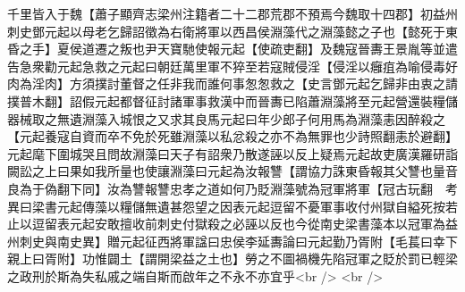 千里皆入于魏【蕭子顯齊志梁州注籍者二十二郡荒郡不預焉今魏取十四郡】初益州刺史鄧元起以母老乞歸詔徵為右衛將軍以西昌侯淵藻代之淵藻懿之子也【懿死于東昏之手】夏侯道遷之叛也尹天寶馳使報元起【使疏吏翻】及魏寇晉夀王景胤等並遣告急衆勸元起急救之元起曰朝廷萬里軍不猝至若寇賊侵淫【侵淫以癰疽為喻侵毒好肉為淫肉】方須撲討董督之任非我而誰何事怱怱救之【史言鄧元起乞歸非由衷之請撲普木翻】詔假元起都督征討諸軍事救漢中而晉夀已陷蕭淵藻將至元起營還裝糧儲器械取之無遺淵藻入城恨之又求其良馬元起曰年少郎子何用馬為淵藻恚因醉殺之【元起養寇自資而卒不免於死雖淵藻以私忿殺之亦不為無罪也少詩照翻恚於避翻】元起麾下圍城哭且問故淵藻曰天子有詔衆乃散遂誣以反上疑焉元起故吏廣漢羅研詣闕訟之上曰果如我所量也使讓淵藻曰元起為汝報讐【謂協力誅東昏報其父讐也量音良為于偽翻下同】汝為讐報讐忠孝之道如何乃貶淵藻號為冠軍將軍【冠古玩翻　考異曰梁書元起傳藻以糧儲無遺甚怨望之因表元起逗留不憂軍事收付州獄自縊死按若止以逗留表元起安敢擅收前刺史付獄殺之必誣以反也今從南史梁書藻本以冠軍為益州刺史與南史異】贈元起征西將軍諡曰忠侯李延夀論曰元起勤乃胥附【毛萇曰幸下親上曰胥附】功惟闢土【謂開梁益之土也】勞之不圖禍機先陷冠軍之貶於罰已輕梁之政刑於斯為失私戚之端自斯而啟年之不永不亦宜乎<br />
<br />
